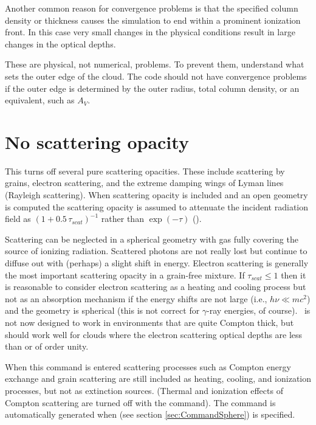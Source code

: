 Another common reason for convergence problems is that
the specified column density or thickness causes the simulation to end
within a prominent ionization front.
In this case very small changes in the
physical conditions result in large changes in the optical depths.  

These
are physical, not numerical, problems.
To prevent them, understand what sets the outer edge of the cloud. 
The code should not have convergence
problems if the outer edge is determined by the outer radius, total column density,
or an equivalent, such as $A_V$.

\section{No scattering opacity}
\label{sec:CommandNoScatteringOpacity}

This turns off several pure scattering opacities.  These include
scattering by grains, electron scattering, and the extreme damping wings
of Lyman lines (Rayleigh scattering).
When scattering opacity is included
and an open geometry is computed the scattering opacity is assumed to
attenuate the incident radiation field as
$\left( {1 + 0.5\,\tau _{scat} } \right)^{ - 1} $
rather than $\exp \left( { - \tau } \right)$ (\citealp{Schuster1905}).

Scattering can be neglected in a spherical geometry with gas fully
covering the source of ionizing radiation.
Scattered photons are not really
lost but continue to diffuse out with (perhaps) a slight shift in energy.
Electron scattering is generally the most important scattering opacity in
a grain-free mixture.
If $ \tau _{scat}  \le 1$
then it is reasonable to consider electron scattering as a heating and
cooling process but not as an absorption mechanism if the energy shifts
are not large (i.e., $ h\nu \ll mc^2$) and the geometry is spherical
(this is not correct for $\gamma$-ray energies,
of course).
\Cloudy\ is not now designed to work in environments that are
quite Compton thick, but should work well for clouds where the electron
scattering optical depths are less than or of order unity.

When this command
is entered scattering processes such as Compton energy exchange 
and grain scattering are still included
as heating, cooling, and ionization processes, but not as extinction sources.
(Thermal and ionization effects of Compton scattering are turned off with
the  command).
The  command is automatically
generated when  (see section \ref{sec:CommandSphere}) is specified.

